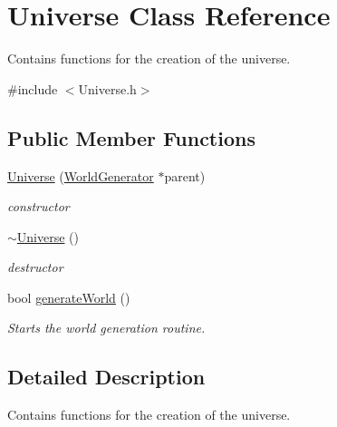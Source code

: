 \hypertarget{class_universe}{\section{Universe Class Reference}
\label{class_universe}
}


Contains functions for the creation of the universe.  




{\ttfamily \#include $<$Universe.\-h$>$}

\subsection*{Public Member Functions}
\begin{DoxyCompactItemize}
\item 
\hyperlink{class_universe_ab32ddf8f3797e862f9aa89528c877bc8}{Universe} (\hyperlink{class_world_generator}{World\-Generator} $\ast$parent)
\begin{DoxyCompactList}\small\item\em constructor \end{DoxyCompactList}\item 
\hypertarget{class_universe_a7723438c7fa497defb4c82ac975152b2}{\hyperlink{class_universe_a7723438c7fa497defb4c82ac975152b2}{$\sim$\-Universe} ()}\label{class_universe_a7723438c7fa497defb4c82ac975152b2}

\begin{DoxyCompactList}\small\item\em destructor \end{DoxyCompactList}\item 
bool \hyperlink{class_universe_a63952bfc2e82fa942883ddf7266bec38}{generate\-World} ()
\begin{DoxyCompactList}\small\item\em Starts the world generation routine. \end{DoxyCompactList}\end{DoxyCompactItemize}


\subsection{Detailed Description}
Contains functions for the creation of the universe. 

